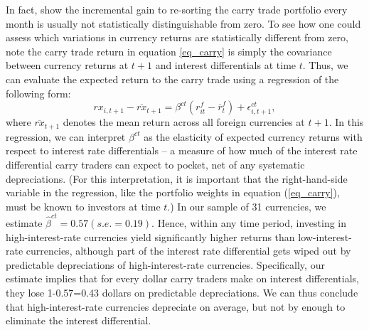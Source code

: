 \documentclass{ar-1col}
\begin{document}
In fact, \citet{HassanMano2019} show the incremental gain to re-sorting the carry trade portfolio every month is usually not statistically distinguishable from zero. To see how one could assess which variations in currency returns are statistically different from zero, note the carry trade return in equation \ref{eq_carry} is simply the covariance between currency returns at $t+1$ and interest differentials at time $t$. Thus, we can evaluate the expected return to the carry trade using a regression of the following form:
\begin{equation}
    rx_{i,t+1} - \overline{rx}_{t+1} 
    = \beta^{ct}\left( r^f_{it}-\overline{r}^f_{t}\right) +\epsilon_{i,t+1}^{ct},  \label{eq_ct}
\end{equation} 
where $\overline{rx}_{t+1}$ denotes the mean return across all foreign currencies at $t+1$. In this regression, we can interpret $\beta^{ct}$ as the elasticity of expected currency returns with respect to interest rate differentials -- a measure of how much of the interest rate differential carry traders can expect to pocket, net of any systematic depreciations. (For this interpretation, it is important that the right-hand-side variable in the regression, like the portfolio weights in equation (\ref{eq_carry}), must be known to investors at time $t$.) In our sample of 31 currencies, we estimate $\hat{\beta}^{ct}=0.57 (s.e.=0.19)$. Hence, within any time period, investing in high-interest-rate currencies yield significantly higher returns than low-interest-rate currencies, although part of the interest rate differential gets wiped out by predictable depreciations of high-interest-rate currencies. Specifically, our estimate implies that for every dollar carry traders make on interest differentials, they lose 1-0.57=0.43 dollars on predictable depreciations. We can thus conclude that high-interest-rate currencies depreciate on average, but not by enough to eliminate the interest differential.
\end{document}

